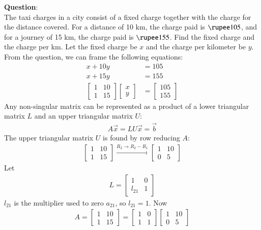\documentclass[journal]{IEEEtran}
\begin{document}
\textbf{Question}:\\ The taxi charges in a city consist of a fixed charge together with the charge for the distance covered. For a distance of 10 km, the charge paid is \( \text{\rupee} 105 \), and for a journey of 15 km, the charge paid is \( \text{\rupee} 155 \). Find the fixed charge and the charge per km. \newline
\solution \newline
Let the fixed charge be \( x \) and the charge per kilometer be \( y \). From the question, we can frame the following equations:\newline
\begin{align}
    x + 10y &= 105 \\
    x + 15y &= 155 \\
    \begin{bmatrix}1 & 10\\1 & 15\end{bmatrix}\begin{bmatrix}x\\y\end{bmatrix} &= \begin{bmatrix}105\\155\end{bmatrix}
\end{align}
Any non-singular matrix can be represented as a product of a lower triangular matrix \( L \) and an upper triangular matrix \( U \):
\begin{align}
    A\vec{x} = LU\vec{x} = \vec{b}
\end{align}
The upper triangular matrix \( U \) is found by row reducing \( A \):
\begin{align}
    \begin{bmatrix}1 & 10\\1 & 15\end{bmatrix} \xrightarrow{R_2 \to R_2 - R_1} \begin{bmatrix}1 & 10\\0 & 5\end{bmatrix}
\end{align}
Let 
\begin{align}
    L = \begin{bmatrix}1 & 0\\l_{21} & 1\end{bmatrix}
\end{align}
\( l_{21} \) is the multiplier used to zero \( a_{21} \), so \( l_{21} = 1 \).\newline
Now
\begin{align}
   A=\begin{bmatrix}1 & 10\\1 & 15\end{bmatrix} = \begin{bmatrix}1 & 0\\1 & 1\end{bmatrix}\begin{bmatrix}1 & 10\\0 & 5\end{bmatrix}
\end{align}
\end{document}
